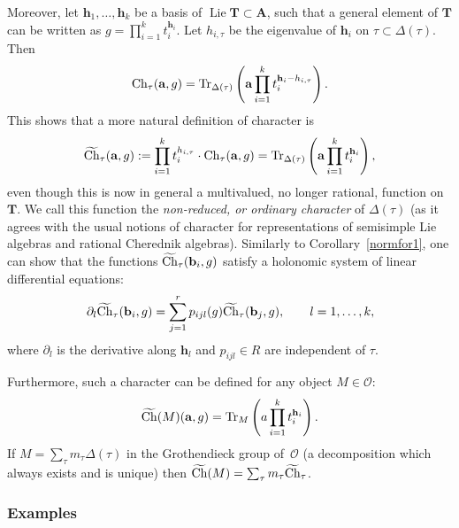 \documentclass[pdftex]{sigma}
\numberwithin{equation}{section}
\begin{document}
Moreover, let ${\mathbf{h}}_1,\dots,{\mathbf{h}}_k$ be a basis of $\operatorname{Lie}{\mathbf T}\subset {\mathbf A}$, such that a general element of ${\mathbf T}$ can be written as $g=\prod\limits_{i=1}^k t_i^{{\mathbf{h}}_i}$. Let $h_{i,\tau}$ be the eigenvalue of ${\mathbf{h}}_i$ on $\tau\subset \Delta(\tau)$. Then
\begin{gather*}
{\rm Ch}_\tau({\mathbf a},g)=\operatorname{Tr}_{\Delta(\tau)}\left({\mathbf a} \prod_{i=1}^k t_i^{{\mathbf{h}}_i-h_{i,\tau}}\right).
\end{gather*}
This shows that a more natural definition of character is
\begin{gather*}
\widetilde{\rm Ch}_\tau({\mathbf a},g):=\prod_{i=1}^k t_i^{h_{i,\tau}}\cdot {\rm Ch}_\tau({\mathbf a},g)=\operatorname{Tr}_{\Delta(\tau)}\left({\mathbf a} \prod_{i=1}^k t_i^{{\mathbf{h}}_i}\right),
\end{gather*}
even though this is now in general a multivalued, no longer rational, function on~${\mathbf T}$. We call this function the {\it non-reduced, or ordinary character} of $\Delta(\tau)$ (as it agrees with the usual notions of character for representations of semisimple Lie algebras and rational Cherednik algebras). Similarly to Corollary~\ref{normfor1}, one can show that the functions $\widetilde{\rm Ch}_\tau({\mathbf b}_i,g)$ satisfy a holonomic system of linear differential equations:{\samepage
\begin{gather*}
\partial_l\widetilde{\rm Ch}_\tau({\mathbf b}_i,g)=\sum_{j=1}^r p_{ijl}(g)\widetilde{\rm Ch}_\tau({\mathbf b}_j,g),\qquad l=1,\dots,k,
\end{gather*}
where $\partial_l$ is the derivative along ${\mathbf{h}}_l$ and $p_{ijl}\in R$ are independent of $\tau$.}

Furthermore, such a character can be defined for any object $M\in \mathcal O$:
\begin{gather*}
\widetilde{\rm Ch}(M)({\mathbf a},g)=\operatorname{Tr}_M\left(a\prod_{i=1}^k t_i^{{\mathbf{h}}_i}\right).
\end{gather*}
If $M=\sum_\tau m_\tau \Delta(\tau)$ in the Grothendieck group of~$\mathcal O$ (a decomposition which always exists and is unique) then $\widetilde{\rm Ch}(M)=\sum_\tau m_\tau \widetilde{\rm Ch}_\tau$.

\subsubsection{Examples}
\end{document}
